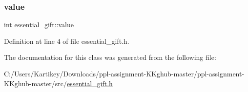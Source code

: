 \subsubsection{\texorpdfstring{value}{value}}
{\footnotesize\ttfamily int essential\+\_\+gift\+::value}



Definition at line 4 of file essential\+\_\+gift.\+h.



The documentation for this class was generated from the following file\+:\begin{DoxyCompactItemize}
\item 
C\+:/\+Users/\+Kartikey/\+Downloads/ppl-\/assignment-\/\+K\+Kghub-\/master/ppl-\/assignment-\/\+K\+Kghub-\/master/src/\hyperlink{essential__gift_8h}{essential\+\_\+gift.\+h}\end{DoxyCompactItemize}
